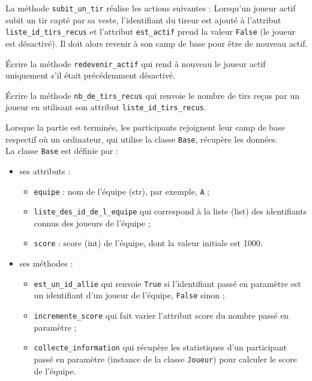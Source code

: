 \documentclass[a4paper,12pt,eval,firamath]{nsi}
\begin{document}
\question La méthode \texttt{subit_un_tir} réalise les actions suivantes :
Lorsqu'un joueur actif subit un tir capté par sa veste, l'identifiant du tireur est
ajouté à l'attribut \texttt{liste_id_tirs_recus} et l'attribut \texttt{est_actif} prend la
valeur \texttt{False} (le joueur est désactivé). Il doit alors revenir à son camp de base pour être de nouveau actif.
\begin{enumalph}
      \item Écrire la méthode \texttt{redevenir_actif} qui rend à nouveau le joueur actif uniquement s'il était précédemment désactivé.\\

      \item Écrire la méthode \texttt{nb_de_tirs_recus} qui renvoie le nombre de tirs reçus par un joueur en utilisant son attribut \texttt{liste_id_tirs_recus}.\\
      
\end{enumalph}

\question Lorsque la partie est terminée, les participants rejoignent leur camp de base respectif où un ordinateur, qui utilise la classe \texttt{Base}, récupère les données.\\
La classe \texttt{Base} est définie par :
\begin{itemize}
      \item ses attributs :
            \begin{itemize}
                  \item \texttt{equipe} : nom de l'équipe (str), par exemple, \texttt{A} ;
                  \item \texttt{liste_des_id_de_l_equipe} qui correspond à la liste (list) des identifiants connus des joueurs de l'équipe ;
                  \item \texttt{score} : score (int) de l'équipe, dont la valeur initiale est 1000.
            \end{itemize}
      \item ses méthodes :
            \begin{itemize}
                  \item \texttt{est_un_id_allie} qui renvoie \texttt{True} si l'identifiant passé en paramètre est un identifiant d'un joueur de l'équipe, \texttt{False} sinon ;
                  \item  \texttt{incremente_score} qui fait varier l'attribut score du nombre passé en paramètre ;
                  \item  \texttt{collecte_information} qui récupère les statistiques d'un participant passé en paramètre (instance de la classe \texttt{Joueur}) pour calculer le score de l'équipe.
            \end{itemize}
\end{itemize}
\end{document}
